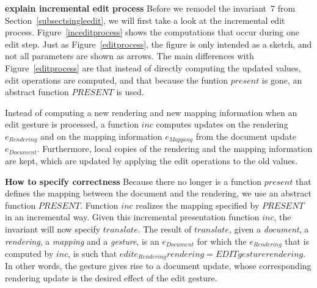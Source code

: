 {\bf explain incremental edit process} Before we remodel the invariant~7 from Section~\ref{subsectsingleedit}, we will first take a look at the incremental edit process. Figure~\ref{inceditprocess} shows the computations that occur during one edit step. Just as Figure~\ref{editprocess}, the figure is only intended as a sketch, and not all parameters are shown as arrows. The main differences with Figure~\ref{editprocess} are that instead of directly computing the updated values, edit operations are computed, and that because the funtion $present$ is gone, an abstract function $PRESENT$ is used. 

Instead of computing a new rendering and new mapping information when an edit gesture is processed, a function $inc$ computes updates on the rendering $e_{Rendering}$ and on the mapping information $e_{Mapping}$ from the document update $e_{Document}$. Furthermore, local copies of the rendering and the mapping information are kept, which are updated by applying the edit operations to the old values.

{\bf How to specify correctness} Because there no longer is a function $present$ that defines the mapping between the document and the rendering, we use an abstract function $PRESENT$. Function $inc$ realizes the mapping specified by $PRESENT$ in an incremental way. Given this incremental presentation function $inc$, the invariant will now specify $translate$. The result of $translate$, given a {\it document}, a {\it rendering}, a {\it mapping} and a {\it gesture}, is an $e_{Document}$ for which the $e_{Rendering}$ that is computed by $inc$, is such that $edit e_{Rendering} rendering = EDIT gesture rendering$. In other words, the gesture gives rise to a document update, whose corresponding rendering update is the desired effect of the edit gesture. 




